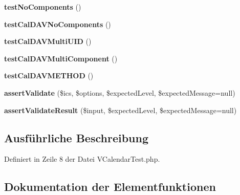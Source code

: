 \begin{DoxyCompactItemize}
{\bfseries test\+No\+Components} ()
\item 
\mbox{\label{class_sabre_1_1_v_object_1_1_component_1_1_v_calendar_test_a1efb2de02c9c2aed766350461452e9e4}} 
{\bfseries test\+Cal\+D\+A\+V\+No\+Components} ()
\item 
\mbox{\label{class_sabre_1_1_v_object_1_1_component_1_1_v_calendar_test_a00247c8424af0035ea4ce9426c8bfd04}} 
{\bfseries test\+Cal\+D\+A\+V\+Multi\+U\+ID} ()
\item 
\mbox{\label{class_sabre_1_1_v_object_1_1_component_1_1_v_calendar_test_a44913b4598a0b9192e4b25dfe5b34828}} 
{\bfseries test\+Cal\+D\+A\+V\+Multi\+Component} ()
\item 
\mbox{\label{class_sabre_1_1_v_object_1_1_component_1_1_v_calendar_test_a6970381b31f558193bd595a64eeaa5ec}} 
{\bfseries test\+Cal\+D\+A\+V\+M\+E\+T\+H\+OD} ()
\item 
\mbox{\label{class_sabre_1_1_v_object_1_1_component_1_1_v_calendar_test_a636f822e803efa20ecbbbad0c871eeaf}} 
{\bfseries assert\+Validate} (\$ics, \$options, \$expected\+Level, \$expected\+Message=null)
\item 
\mbox{\label{class_sabre_1_1_v_object_1_1_component_1_1_v_calendar_test_a0af0e773f0686c9f1ff42ce36a0731d3}} 
{\bfseries assert\+Validate\+Result} (\$input, \$expected\+Level, \$expected\+Message=null)
\end{DoxyCompactItemize}


\subsection{Ausführliche Beschreibung}


Definiert in Zeile 8 der Datei V\+Calendar\+Test.\+php.



\subsection{Dokumentation der Elementfunktionen}
\mbox{\label{class_sabre_1_1_v_object_1_1_component_1_1_v_calendar_test_a1f3c5983868949c93e2bd62478ddb0f9}} 
